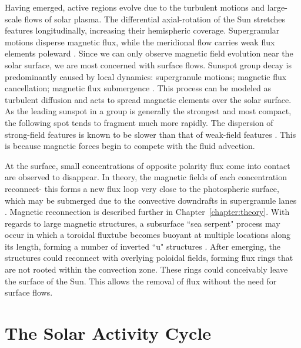 Having emerged, active regions evolve due to the turbulent motions and large-scale flows of solar plasma. The differential axial-rotation of the Sun stretches features longitudinally, increasing their hemispheric coverage. Supergranular motions disperse magnetic flux, while the meridional flow carries weak flux elements poleward \citep{Mosher:1977}. Since we can only observe magnetic field evolution near the solar surface, we are most concerned with surface flows. Sunspot group decay is predominantly caused by local dynamics: supergranule motions; magnetic flux cancellation; magnetic flux submergence \citep{Schrijver:1997b}. This process can be modeled as turbulent diffusion \citep{Spruit:1987} and acts to spread magnetic elements over the solar surface. As the leading sunspot in a group is generally the strongest and most compact, the following spot tends to fragment much more rapidly. The dispersion of strong-field features is known to be slower than that of weak-field features \citep{Schrijver:1996}. This is because magnetic forces begin to compete with the fluid advection. 

At the surface, small concentrations of opposite polarity flux come into contact are observed to disappear. In theory, the magnetic fields of each concentration reconnect- this forms a new flux loop very close to the photospheric surface, which may be submerged due to the convective downdrafts in supergranule lanes \citep{Schrijver:1997b}. Magnetic reconnection is described further in Chapter~\ref{chapter:theory}. With regards to large magnetic structures, a subsurface ``sea serpent" process may occur in which a toroidal \gls{fluxtube} becomes buoyant at multiple locations along its length, forming a number of inverted ``u" structures \citep{Spruit:1987}. After emerging, the structures could reconnect with overlying poloidal fields, forming flux rings that are not rooted within the convection zone. These rings could conceivably leave the surface of the Sun. This allows the removal of flux without the need for surface flows. 

\section{The Solar Activity Cycle}\label{sect:introsolcyc}

